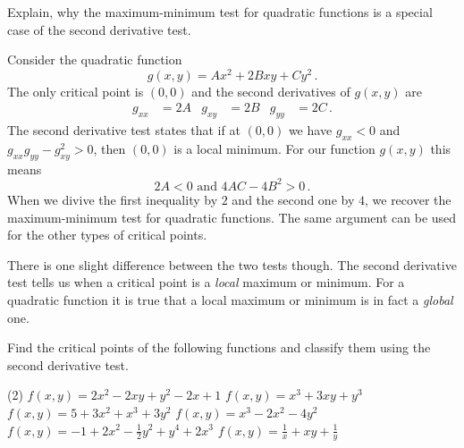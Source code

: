 \begin{question}
Explain, why the maximum-minimum test for quadratic functions is a special case of the second derivative test.
\end{question}

\begin{solution}
Consider the quadratic function
\[
g(x,y) = Ax^2 + 2Bxy + Cy^2\,.
\]
The only critical point is $(0,0)$ and the second derivatives of $g(x,y)$ are
\begin{align*}
g_{xx} &= 2A &
g_{xy} &= 2B &
g_{yy} &= 2C\,.
\end{align*}
The second derivative test states that if at $(0,0)$ we have $g_{xx} < 0$ and $g_{xx}g_{yy} - g_{xy}^2 > 0$, then $(0,0)$ is a local minimum. For our function $g(x,y)$ this means
\[
2A < 0 \text{ and } 4AC - 4B^2 > 0\,.
\]
When we divive the first inequality by $2$ and the second one by $4$, we recover the maximum-minimum test for quadratic functions. The same argument can be used for the other types of critical points.

\begin{note*}
There is one slight difference between the two tests though. The second derivative test tells us when a critical point is a \emph{local} maximum or minimum. For a quadratic function it is true that a local maximum or minimum is in fact a \emph{global} one.
\end{note*}
\end{solution}

\begin{question}
Find the critical points of the following functions and classify them using the second derivative test.
\begin{tasks}(2)
\task
$f(x,y) = 2x^2-2xy+y^2-2x+1$
\task
$f(x,y) = x^3 + 3xy + y^3$
\task
$f(x,y) = 5 + 3x^2 + x^3 + 3y^2$
\task
$f(x,y) = x^3 - 2x^2 - 4y^2$
\task
$f(x,y) = -1 + 2x^2 - \frac 12 y^2 + y^4 + 2x^3$
\task
$f(x,y) = \frac 1x + xy + \frac 1y$
\end{tasks}
\end{question}

